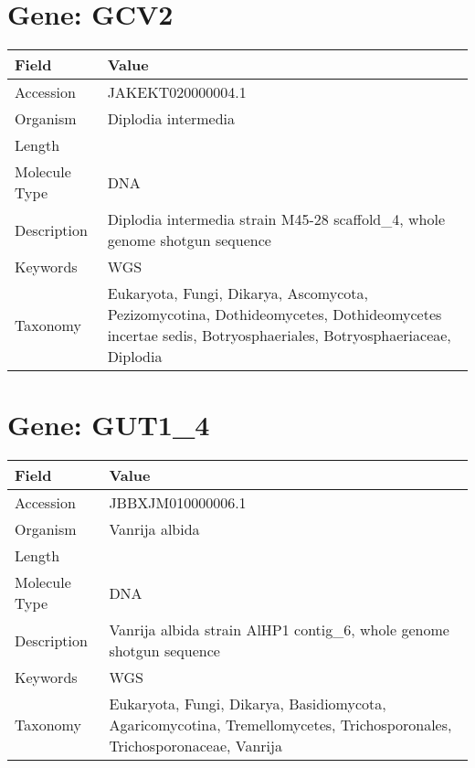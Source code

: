 \documentclass[10pt]{article}
\begin{document}
\section{Gene: GCV2}
{\footnotesize
\begin{longtable}{>{\raggedright\arraybackslash}p{4.5cm} >{\raggedright\arraybackslash}p{11.5cm}}
\textbf{Field} & \textbf{Value} \\
\hline
Accession & JAKEKT020000004.1 \\
Organism & Diplodia intermedia \\
Length & 742941 \\
Molecule Type & DNA \\
Description & Diplodia intermedia strain M45-28 scaffold\_4, whole genome shotgun sequence \\
Keywords & WGS \\
Taxonomy & Eukaryota, Fungi, Dikarya, Ascomycota, Pezizomycotina, Dothideomycetes, Dothideomycetes incertae sedis, Botryosphaeriales, Botryosphaeriaceae, Diplodia \\
\end{longtable}
}

\vspace{1em}
\section{Gene: GUT1\_4}
{\footnotesize
\begin{longtable}{>{\raggedright\arraybackslash}p{4.5cm} >{\raggedright\arraybackslash}p{11.5cm}}
\textbf{Field} & \textbf{Value} \\
\hline
Accession & JBBXJM010000006.1 \\
Organism & Vanrija albida \\
Length & 2511085 \\
Molecule Type & DNA \\
Description & Vanrija albida strain AlHP1 contig\_6, whole genome shotgun sequence \\
Keywords & WGS \\
Taxonomy & Eukaryota, Fungi, Dikarya, Basidiomycota, Agaricomycotina, Tremellomycetes, Trichosporonales, Trichosporonaceae, Vanrija \\
\end{longtable}
}

\vspace{1em}
\end{document}
